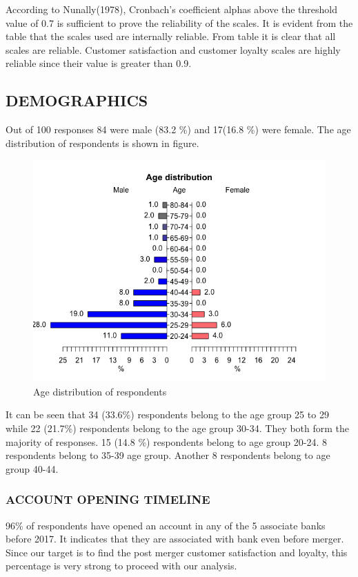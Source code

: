 \documentclass[a4paper, 12pt]{extarticle}
\begin{document}
{\par According to Nunally(1978), Cronbach's coefficient alphas above the threshold value of 0.7 is sufficient to prove the reliability of the scales. It is evident from the table that the scales used are internally reliable. From table it is clear that all scales are reliable. Customer satisfaction and customer loyalty scales are highly reliable since their value is greater than 0.9.

\subsection{DEMOGRAPHICS}
Out of 100 responses 84 were male (83.2 \%) and 17(16.8 \%) were female. The age distribution of respondents is shown in figure.
\begin{figure}[H]
\centering
\includegraphics[scale=0.7]{age.png}
\caption{Age distribution of respondents}
\end{figure}
It can be seen that 34 (33.6\%) respondents belong to the age group 25 to 29 while 22 (21.7\%) respondents belong to the age group 30-34. They both form the majority of responses. 15 (14.8 \%) respondents belong to age group 20-24. 8 respondents belong to 35-39 age group. Another 8 respondents belong to age group 40-44.

\subsubsection{ACCOUNT OPENING TIMELINE}
96\% of respondents have opened an account in any of the 5 associate banks before 2017. It indicates that they are associated with bank even before merger. Since our target is to find the post merger customer satisfaction and loyalty, this percentage is very strong to proceed with our analysis.

}
\end{document}
